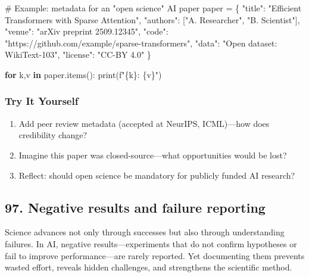 \documentclass[
  letterpaper,
  DIV=11,
  numbers=noendperiod]{scrreprt}
\newenvironment{Shaded}{\begin{snugshade}}{\end{snugshade}}
\newcommand{\BuiltInTok}[1]{\textcolor[rgb]{0.00,0.23,0.31}{#1}}
\newcommand{\CommentTok}[1]{\textcolor[rgb]{0.37,0.37,0.37}{#1}}
\newcommand{\ControlFlowTok}[1]{\textcolor[rgb]{0.00,0.23,0.31}{\textbf{#1}}}
\newcommand{\KeywordTok}[1]{\textcolor[rgb]{0.00,0.23,0.31}{\textbf{#1}}}
\newcommand{\NormalTok}[1]{\textcolor[rgb]{0.00,0.23,0.31}{#1}}
\newcommand{\OperatorTok}[1]{\textcolor[rgb]{0.37,0.37,0.37}{#1}}
\newcommand{\SpecialCharTok}[1]{\textcolor[rgb]{0.37,0.37,0.37}{#1}}
\newcommand{\SpecialStringTok}[1]{\textcolor[rgb]{0.13,0.47,0.30}{#1}}
\newcommand{\StringTok}[1]{\textcolor[rgb]{0.13,0.47,0.30}{#1}}
\providecommand{\tightlist}{%
  \setlength{\itemsep}{0pt}\setlength{\parskip}{0pt}}
\begin{document}
\begin{Shaded}
\begin{Highlighting}[]
\CommentTok{\# Example: metadata for an "open science" AI paper}
\NormalTok{paper }\OperatorTok{=}\NormalTok{ \{}
    \StringTok{"title"}\NormalTok{: }\StringTok{"Efficient Transformers with Sparse Attention"}\NormalTok{,}
    \StringTok{"authors"}\NormalTok{: [}\StringTok{"A. Researcher"}\NormalTok{, }\StringTok{"B. Scientist"}\NormalTok{],}
    \StringTok{"venue"}\NormalTok{: }\StringTok{"arXiv preprint 2509.12345"}\NormalTok{,}
    \StringTok{"code"}\NormalTok{: }\StringTok{"https://github.com/example/sparse{-}transformers"}\NormalTok{,}
    \StringTok{"data"}\NormalTok{: }\StringTok{"Open dataset: WikiText{-}103"}\NormalTok{,}
    \StringTok{"license"}\NormalTok{: }\StringTok{"CC{-}BY 4.0"}
\NormalTok{\}}

\ControlFlowTok{for}\NormalTok{ k,v }\KeywordTok{in}\NormalTok{ paper.items():}
    \BuiltInTok{print}\NormalTok{(}\SpecialStringTok{f"}\SpecialCharTok{\{}\NormalTok{k}\SpecialCharTok{\}}\SpecialStringTok{: }\SpecialCharTok{\{}\NormalTok{v}\SpecialCharTok{\}}\SpecialStringTok{"}\NormalTok{)}
\end{Highlighting}
\end{Shaded}

\subsubsection{Try It Yourself}\label{try-it-yourself-95}

\begin{enumerate}
\def\labelenumi{\arabic{enumi}.}
\tightlist
\item
  Add peer review metadata (accepted at NeurIPS, ICML)---how does
  credibility change?
\item
  Imagine this paper was closed-source---what opportunities would be
  lost?
\item
  Reflect: should open science be mandatory for publicly funded AI
  research?
\end{enumerate}

\subsection{97. Negative results and failure
reporting}\label{negative-results-and-failure-reporting}

Science advances not only through successes but also through
understanding failures. In AI, negative results---experiments that do
not confirm hypotheses or fail to improve performance---are rarely
reported. Yet documenting them prevents wasted effort, reveals hidden
challenges, and strengthens the scientific method.
\end{document}
